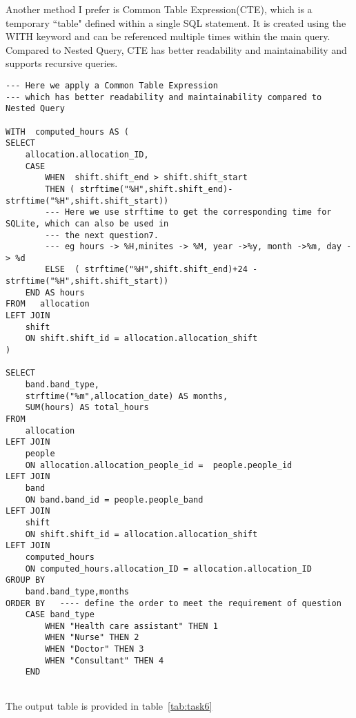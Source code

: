 \documentclass{article}
\begin{document}
Another method I prefer is Common Table Expression(CTE), which is a temporary ``table" defined within a single SQL statement. It is created using the WITH keyword and can be referenced multiple times within the main query. Compared to Nested Query, CTE has better readability and maintainability and supports recursive queries.

\begin{lstlisting}[style=sqlstyle]
--- Here we apply a Common Table Expression 
--- which has better readability and maintainability compared to Nested Query

WITH  computed_hours AS (
SELECT
    allocation.allocation_ID,
    CASE
        WHEN  shift.shift_end > shift.shift_start  
        THEN ( strftime("%H",shift.shift_end)- strftime("%H",shift.shift_start))  
        --- Here we use strftime to get the corresponding time for SQLite, which can also be used in 
        --- the next question7.
        --- eg hours -> %H,minites -> %M, year ->%y, month ->%m, day -> %d
        ELSE  ( strftime("%H",shift.shift_end)+24 - strftime("%H",shift.shift_start))  
    END AS hours
FROM   allocation
LEFT JOIN
    shift 
    ON shift.shift_id = allocation.allocation_shift
)

SELECT
    band.band_type,
    strftime("%m",allocation_date) AS months,
    SUM(hours) AS total_hours
FROM
    allocation
LEFT JOIN
    people
    ON allocation.allocation_people_id =  people.people_id
LEFT JOIN
    band
    ON band.band_id = people.people_band
LEFT JOIN
    shift
    ON shift.shift_id = allocation.allocation_shift
LEFT JOIN
    computed_hours
    ON computed_hours.allocation_ID = allocation.allocation_ID
GROUP BY
    band.band_type,months
ORDER BY   ---- define the order to meet the requirement of question
    CASE band_type 
        WHEN "Health care assistant" THEN 1
        WHEN "Nurse" THEN 2
        WHEN "Doctor" THEN 3
        WHEN "Consultant" THEN 4
    END
	
\end{lstlisting}

The output table is provided in table~\ref{tab:task6}
\end{document}
